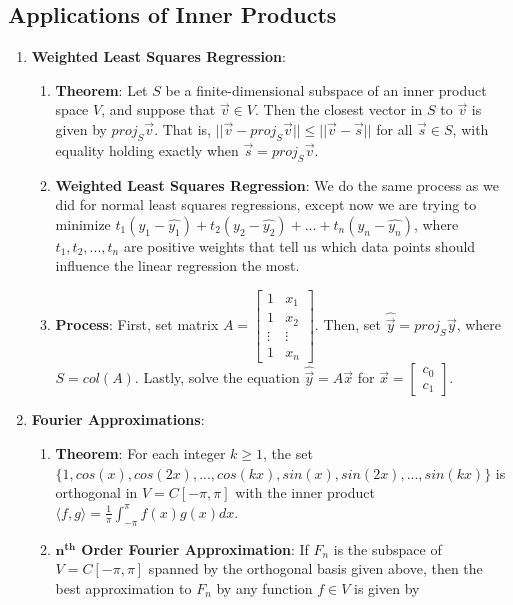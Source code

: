 \documentclass[10pt]{article}
\begin{document}
\subsection{Applications of Inner Products}
\begin{enumerate}
\item \textbf{Weighted Least Squares Regression}: 
\begin{enumerate}
\item \textbf{Theorem}: Let $S$ be a finite-dimensional subspace of an inner product space $V$, and suppose that $\vec{v} \in V$. Then the closest vector in $S$ to $\vec{v}$ is given by $proj_{S}\vec{v}$. That is, $||\vec{v} - proj_S\vec{v}|| \leq ||\vec{v}-\vec{s}||$ for all $\vec{s} \in S$, with equality holding exactly when $\vec{s} = proj_S\vec{v}$.
\item \textbf{Weighted Least Squares Regression}: We do the same process as we did for normal least squares regressions, except now we are trying to minimize $t_1(y_1-\hat{y_1}) + t_2(y_2-\hat{y_2}) + ... + t_n(y_n-\hat{y_n})$, where $t_1,t_2,...,t_n$ are positive weights that tell us which data points should influence the linear regression the most.
\item \textbf{Process}: First, set matrix $A = \begin{bmatrix}
1 & x_1 \\
1 & x_2 \\
\vdots & \vdots \\
1 & x_n
\end{bmatrix}$. Then, set $\hat{\vec{y}} = proj_S\vec{y}$, where $S = col(A)$. Lastly, solve the equation $\hat{\vec{y}} = A\vec{x}$ for $\vec{x} = \begin{bmatrix}
c_0 \\
c_1
\end{bmatrix}$.
\end{enumerate}
\item \textbf{Fourier Approximations}: 
\begin{enumerate}
\item \textbf{Theorem}: For each integer $k \geq 1$, the set $\lbrace 1,cos(x), cos(2x),..., cos(kx), sin(x), sin(2x), ..., sin(kx) \rbrace$ is orthogonal in $V = C[-\pi,\pi]$ with the inner product $\langle f,g \rangle = \frac{1}{\pi} \int_{-\pi}^{\pi}f(x)g(x)dx$.
\item \textbf{$\mathbf{n^{th}}$ Order Fourier Approximation}: If $F_n$ is the subspace of $V=C[-\pi,\pi]$ spanned by the orthogonal basis given above, then the best approximation to $F_n$ by any function $f \in V$ is given by 

\end{enumerate}
\end{enumerate}
\end{document}
